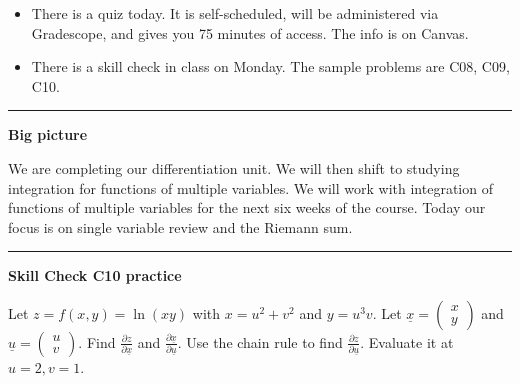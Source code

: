 \documentclass[12pt,letterpaper,noanswers]{exam}
\begin{document}
 \pdfpageheight 11in 
  \pdfpagewidth 8.5in





\begin{itemize}
\itemsep0em
    \item There is a quiz today.  It is self-scheduled, will be administered via Gradescope, and gives you 75 minutes of access.  The info is on Canvas.
    \item There is a skill check in class on Monday.  The sample problems are C08, C09, C10.
\end{itemize}

\hrule
\vspace{0.2cm}


\noindent\textbf{Big picture}

We are completing our differentiation unit.  We will then shift to studying integration for functions of multiple variables.  We will work with integration of functions of multiple variables for the next six weeks of the course.  Today our focus is on single variable review and the Riemann sum.

\vspace{0.2cm}
\hrule
\vspace{0.2cm}
\noindent\textbf{Skill Check C10 practice}

\begin{questions}
\item Let $z = f(x,y) = \ln(xy)$ with $x = u^2+v^2$ and $y = u^3v$.  Let $\displaystyle\underline{x} = \left(\begin{array}{c} x\\ y\end{array}\right)$ and $\displaystyle\underline{u} = \left(\begin{array}{c} u\\ v\end{array}\right)$. Find $\displaystyle\frac{\partial z}{\partial\underline{x}}$ and $\displaystyle\frac{\partial \underline{x}}{\partial\underline{u}}$.  Use the chain rule to find $\displaystyle\frac{\partial z}{\partial\underline{u}}$.  Evaluate it at $u = 2, v = 1$.
\end{questions}
\end{document}
